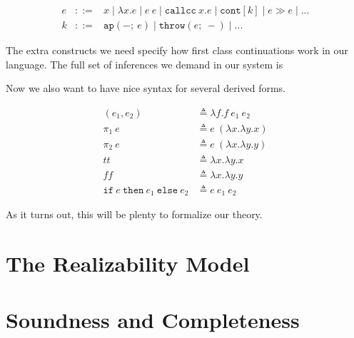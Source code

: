 \documentclass{amsart}
\newcommand{\val}[1]{#1\ \mathbf{val}}
\newcommand{\push}{\rhd}
\newcommand{\pull}{\lhd}
\newcommand{\ap}[1]{\mathtt{ap}(-;\ #1)}
\newcommand{\throw}[1]{\mathtt{throw}(#1;\ -)}
\newcommand{\callcc}{\mathtt{callcc}~}
\newcommand{\cont}{\mathtt{cont}}
\newcommand{\ite}[3]{\mathtt{if}\ #1\ \mathtt{then}\ #2\ \mathtt{else}\ #3}
\begin{document}
\[
  \begin{array}{lcl}
    e & ::= & x \mid \lambda x. e \mid e\ e \mid \callcc x. e \mid
              \cont[k] \mid e \gg e \mid ...\\
    k & ::= & \ap{e} \mid \throw{e} \mid ...
  \end{array}
\]

The extra constructs we need specify how first class continuations
work in our language. The full set of inferences we demand in our
system is


Now we also want to have nice syntax for several derived forms.

\begin{align*}
  (e_1, e_2) &\triangleq \lambda f. f\ e_1\ e_2\\
  \pi_1\ e &\triangleq e\ (\lambda x. \lambda y. x)\\
  \pi_2\ e &\triangleq e\ (\lambda x. \lambda y. y)\\
  tt &\triangleq \lambda x. \lambda y. x\\
  ff &\triangleq \lambda x. \lambda y. y\\
  \ite{e}{e_1}{e_2} &\triangleq e\ e_1\ e_2
\end{align*}

As it turns out, this will be plenty to formalize our theory.

\section{The Realizability Model}

\section{Soundness and Completeness}
\end{document}
